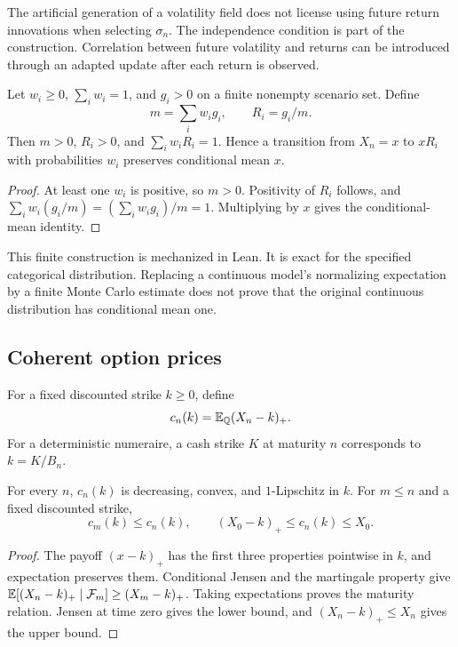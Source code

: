 The artificial generation of a volatility field does not license using future return innovations when selecting $\sigma_n$. The independence condition is part of the construction. Correlation between future volatility and returns can be introduced through an adapted update after each return is observed.

\begin{proposition}\label{prop:finite-martingale}
Let $w_i\ge0$, $\sum_iw_i=1$, and $g_i>0$ on a finite nonempty scenario set. Define
\[
 m=\sum_iw_ig_i,\qquad R_i=g_i/m.
\]
Then $m>0$, $R_i>0$, and $\sum_iw_iR_i=1$. Hence a transition from $X_n=x$ to $xR_i$ with probabilities $w_i$ preserves conditional mean $x$.
\end{proposition}
\begin{proof}
At least one $w_i$ is positive, so $m>0$. Positivity of $R_i$ follows, and
$\sum_iw_i(g_i/m)=(\sum_iw_ig_i)/m=1$. Multiplying by $x$ gives the conditional-mean identity.
\end{proof}

This finite construction is mechanized in Lean. It is exact for the specified categorical distribution. Replacing a continuous model's normalizing expectation by a finite Monte Carlo estimate does not prove that the original continuous distribution has conditional mean one.

\subsection{Coherent option prices}
For a fixed discounted strike $k\ge0$, define
\begin{equation}
 c_n(k)=\mathbb E_\mathbb Q(X_n-k)_+.
\end{equation}
For a deterministic numeraire, a cash strike $K$ at maturity $n$ corresponds to $k=K/B_n$.

\begin{proposition}\label{prop:option-shape}
For every $n$, $c_n(k)$ is decreasing, convex, and $1$-Lipschitz in $k$. For $m\le n$ and a fixed discounted strike,
\[
 c_m(k)\le c_n(k),\qquad
 (X_0-k)_+\le c_n(k)\le X_0.
\]
\end{proposition}
\begin{proof}
The payoff $(x-k)_+$ has the first three properties pointwise in $k$, and expectation preserves them. Conditional Jensen and the martingale property give
$\mathbb E[(X_n-k)_+\mid\mathcal F_m]\ge(X_m-k)_+$.
Taking expectations proves the maturity relation. Jensen at time zero gives the lower bound, and $(X_n-k)_+\le X_n$ gives the upper bound.
\end{proof}

